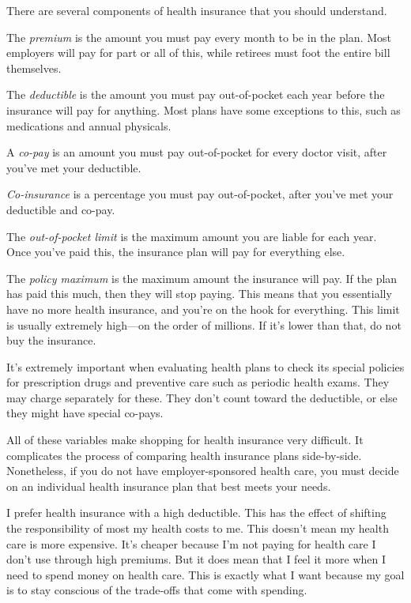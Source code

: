 There are several components of health insurance that you should understand.

The \emph{premium} is the amount you must pay every month to be in the plan. Most employers will pay for part or all of this, while retirees must foot the entire bill themselves.

The \emph{deductible} is the amount you must pay out-of-pocket each year before the insurance will pay for anything. Most plans have some exceptions to this, such as medications and annual physicals.

A \emph{co-pay} is an amount you must pay out-of-pocket for every doctor visit, after you've met your deductible.

\emph{Co-insurance} is a percentage you must pay out-of-pocket, after you've met your deductible and co-pay.

The \emph{out-of-pocket limit} is the maximum amount you are liable for each year. Once you've paid this, the insurance plan will pay for everything else.

The \emph{policy maximum} is the maximum amount the insurance will pay. If the plan has paid this much, then they will stop paying. This means that you essentially have no more health insurance, and you're on the hook for everything. This limit is usually extremely high---on the order of millions. If it's lower than that, do not buy the insurance.

It's extremely important when evaluating health plans to check its special policies for prescription drugs and preventive care such as periodic health exams. They may charge separately for these. They don't count toward the deductible, or else they might have special co-pays.

All of these variables make shopping for health insurance very difficult. It complicates the process of comparing health insurance plans side-by-side. Nonetheless, if you do not have employer-sponsored health care, you must decide on an individual health insurance plan that best meets your needs.

I prefer health insurance with a high deductible. This has the effect of shifting the responsibility of most my health costs to me. This doesn't mean my health care is more expensive. It's cheaper because I'm not paying for health care I don't use through high premiums. But it does mean that I feel it more when I need to spend money on health care. This is exactly what I want because my goal is to stay conscious of the trade-offs that come with spending.

